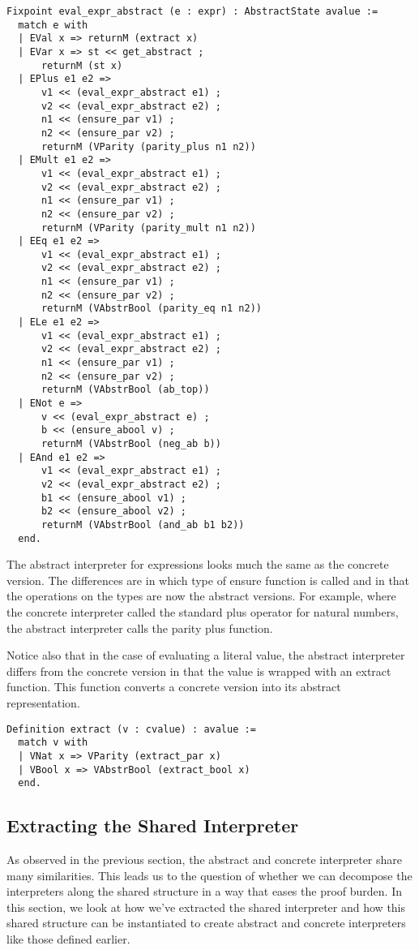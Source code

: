 \begin{verbatim}
Fixpoint eval_expr_abstract (e : expr) : AbstractState avalue :=
  match e with
  | EVal x => returnM (extract x)
  | EVar x => st << get_abstract ;
      returnM (st x)
  | EPlus e1 e2 => 
      v1 << (eval_expr_abstract e1) ;
      v2 << (eval_expr_abstract e2) ;
      n1 << (ensure_par v1) ;
      n2 << (ensure_par v2) ;
      returnM (VParity (parity_plus n1 n2))
  | EMult e1 e2 =>
      v1 << (eval_expr_abstract e1) ;
      v2 << (eval_expr_abstract e2) ;
      n1 << (ensure_par v1) ;
      n2 << (ensure_par v2) ;
      returnM (VParity (parity_mult n1 n2))
  | EEq e1 e2 =>
      v1 << (eval_expr_abstract e1) ;
      v2 << (eval_expr_abstract e2) ;
      n1 << (ensure_par v1) ;
      n2 << (ensure_par v2) ;
      returnM (VAbstrBool (parity_eq n1 n2))
  | ELe e1 e2 =>
      v1 << (eval_expr_abstract e1) ;
      v2 << (eval_expr_abstract e2) ;
      n1 << (ensure_par v1) ;
      n2 << (ensure_par v2) ;
      returnM (VAbstrBool (ab_top))
  | ENot e =>
      v << (eval_expr_abstract e) ;
      b << (ensure_abool v) ;
      returnM (VAbstrBool (neg_ab b))
  | EAnd e1 e2 =>
      v1 << (eval_expr_abstract e1) ;
      v2 << (eval_expr_abstract e2) ;
      b1 << (ensure_abool v1) ;
      b2 << (ensure_abool v2) ;
      returnM (VAbstrBool (and_ab b1 b2))
  end.
\end{verbatim}

The abstract interpreter for expressions looks much the same as the concrete
version. The differences are in which type of ensure function is called and in
that the operations on the types are now the abstract versions. For example,
where the concrete interpreter called the standard plus operator for natural
numbers, the abstract interpreter calls the parity plus function.

Notice also that in the case of evaluating a literal value, the abstract
interpreter differs from the concrete version in that the value is wrapped with
an extract function. This function converts a concrete version into its
abstract representation.

\begin{verbatim}
Definition extract (v : cvalue) : avalue :=
  match v with
  | VNat x => VParity (extract_par x)
  | VBool x => VAbstrBool (extract_bool x)
  end.
\end{verbatim}

\subsection{Extracting the Shared Interpreter}\label{sec:shared_interpreter}
As observed in the previous section, the abstract and concrete interpreter
share many similarities. This leads us to the question of whether we can
decompose the interpreters along the shared structure in a way that eases the
proof burden. In this section, we look at how we've extracted the shared
interpreter and how this shared structure can be instantiated to create
abstract and concrete interpreters like those defined earlier.

